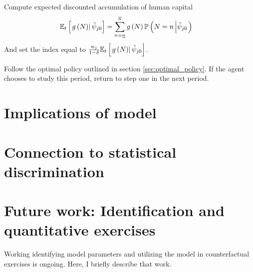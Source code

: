 \documentclass[11 pt]{article}
\newcommand{\pr}[1]{\left( #1 \right)}
\newcommand{\ce}[2]{\left[\left. #1 \right\vert #2 \right]}
\newcommand{\crs}[2]{#1 \left\vert #2 \right.}
\begin{document}
\begin{outline}
\item Compute expected discounted accumulation of human capital
\begin{align*}
    \EE_t \ce{
        g\pr{N}
    }{\hat{\psi}_{j0}} 
    &=
    \sum_{n = \underline{n}}^{\overline{n}}
    g\pr{N}
    \mathbb{P}
    \pr{\crs{
        N = n
    }{\hat{\psi}_{j0}}
    }
\end{align*}
And set the index equal to $\frac{w_j}{1 - \delta} \EE_t \ce{g\pr{N}}{\hat{\psi}_{j0}} $.

\item Follow the optimal policy outlined in section \ref{sec:optimal_policy}. If the agent chooses to study this period, return to step one in the next period. 

\end{outline}



\section{Implications of model}\label{sec:sims}



\section{Connection to statistical discrimination}\label{sec:stat_discrim}



\section{Future work: Identification and quantitative exercises}\label{sec:identification}

Working identifying model parameters and utilizing the model in counterfactual exercises is ongoing.
Here, I briefly describe that work.

\end{document}

